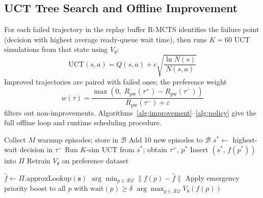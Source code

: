\documentclass[10pt,journal,compsoc]{IEEEtran}
\begin{document}
\subsection{UCT Tree Search and Offline Improvement}

For each failed trajectory in the replay buffer R-MCTS identifies the
failure point (decision with highest average ready-queue wait time), then
runs $K{=}60$ UCT simulations from that state using $V_\theta$:
\begin{equation}
  \text{UCT}(s,a) = Q(s,a) + c\sqrt{\frac{\ln N(s)}{N(s,a)}}
  \label{eq:uct}
\end{equation}
Improved trajectories are paired with failed ones; the preference weight
\begin{equation}
  w(\tau) = \frac{\max(0,\;R_{\text{pw}}(\tau^+)-R_{\text{pw}}(\tau^-))}
    {R_{\text{pw}}(\tau^-)+\varepsilon}
  \label{eq:weight}
\end{equation}
filters out non-improvements.
Algorithms~\ref{alg:improvement}--\ref{alg:policy} give the full
offline loop and runtime scheduling procedure.

\begin{algorithm}[!t]
\caption{R-MCTS Offline Improvement Loop}
\label{alg:improvement}
\begin{algorithmic}[1]
\State Collect $M$ warmup episodes; store in $\mathcal{B}$
  \State Add 10 new episodes to $\mathcal{B}$
    \State $s^* \leftarrow$ highest-wait decision in $\tau^-$
    \State Run $K$-sim UCT from $s^*$; obtain $\tau^+$, $p^*$
      \State Insert $(s^*,\,f(p^*))$ into $\Pi$
    \EndIf
  \EndFor
  \State Retrain $V_\theta$ on preference dataset
\EndFor
\end{algorithmic}
\end{algorithm}

\begin{algorithm}[!t]
\caption{R-MCTS Runtime Scheduling}
\label{alg:policy}
\begin{algorithmic}[1]
\State $\hat{f} \leftarrow \Pi.\text{approxLookup}(\mathbf{s})$
  \State \Return $\arg\min_{p \in \mathcal{RQ}} \|f(p)-\hat{f}\|$
\EndIf
\State Apply emergency priority boost to all $p$ with $\text{wait}(p)\ge\delta$
\State \Return $\arg\max_{p \in \mathcal{RQ}} V_\theta(f(p))$
\end{algorithmic}
\end{algorithm}
\end{document}
